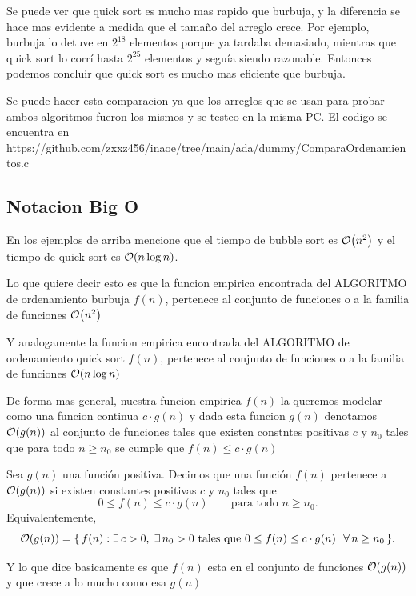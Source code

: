 \documentclass[11pt,letterpaper]{article}
\begin{document}
Se puede ver que quick sort es mucho mas rapido que burbuja, y la diferencia se hace mas evidente a medida que el tamaño del arreglo crece. Por ejemplo, burbuja lo detuve en $2^{18}$ elementos porque ya tardaba demasiado, mientras que quick sort lo corrí hasta $2^{25}$ elementos y seguía siendo razonable.
Entonces podemos concluir que quick sort es mucho mas eficiente que burbuja.

\begin{ojo}
  Se puede hacer esta comparacion ya que los arreglos que se usan para probar ambos algoritmos fueron los mismos y se testeo en la misma PC. 
  El codigo se encuentra en https://github.com/zxxz456/inaoe/tree/main/ada/dummy/ComparaOrdenamientos.c
\end{ojo}

\newpage

\subsection*{Notacion Big O}
En los ejemplos de arriba mencione que el tiempo de bubble sort es $\mathcal{O}\!\left(n^2\right)$ y el tiempo de quick sort es $\mathcal{O}\!\left(n \log n\right)$.

Lo que quiere decir esto es que la funcion empirica encontrada del ALGORITMO de ordenamiento burbuja $f(n)$, pertenece al conjunto de funciones o a la familia de funciones $\mathcal{O}\!\left(n^2\right)$

Y analogamente la funcion empirica encontrada del ALGORITMO de ordenamiento quick sort $f(n)$, pertenece al conjunto de funciones o a la familia de funciones $\mathcal{O}\!\left(n \log n\right)$

De forma mas general, nuestra funcion empirica $f(n)$ la queremos modelar como una funcion continua $c \cdot g(n)$
y dada esta funcion $g(n)$ denotamos $\mathcal{O}\!\left(g(n)\right)$ al conjunto de funciones tales que existen constntes positivas
$c$ y $n_0$ tales que para todo $n \geq n_0$ se cumple que $f(n) \leq c \cdot g(n)$

\begin{definicion}
  Sea $g(n)$ una función positiva. Decimos que una función $f(n)$ pertenece a
  $\mathcal{O}\!\left(g(n)\right)$ si existen constantes positivas $c$ y $n_0$ tales que
  \[
    0 \leq f(n) \leq c \cdot g(n) \qquad \text{para todo } n \geq n_0 .
  \]
  Equivalentemente,
  \[
    \mathcal{O}\!\left(g(n)\right) = \{\, f(n) : \exists\, c > 0,\; \exists\, n_0 > 0
    \ \text{tales que}\ 0 \leq f(n) \leq c\cdot g(n)\ \ \forall\, n \geq n_0 \,\}.
  \]
\end{definicion}

Y lo que dice basicamente es que $f(n)$ esta en el conjunto de funciones $\mathcal{O}\!\left(g(n)\right)$ y que crece a lo mucho como esa $g(n)$
\end{document}
